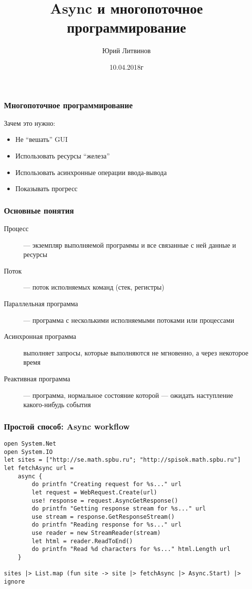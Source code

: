 \documentclass[xetex,mathserif,serif]{beamer}
\title{Async и многопоточное программирование}
\author{Юрий Литвинов}
\date{10.04.2018г}
\begin{document}
	
	\frame{\titlepage}

	\begin{frame}
		\frametitle{Многопоточное программирование}
		Зачем это нужно:
		\begin{itemize}
			\item Не ``вешать'' GUI
			\item Использовать ресурсы ``железа''
			\item Использовать асинхронные операции ввода-вывода
			\item Показывать прогресс
		\end{itemize}
	\end{frame}

	\begin{frame}
		\frametitle{Основные понятия}
		\begin{description}
			\item[Процесс] --- экземпляр выполняемой программы и все связанные с ней данные и ресурсы
			\item[Поток] --- поток исполняемых команд (стек, регистры)
			\item[Параллельная программа] --- программа с несколькими исполняемыми потоками или процессами
			\item[Асинхронная программа] выполняет запросы, которые выполняются не мгновенно, а через некоторое время
			\item[Реактивная программа] --- программа, нормальное состояние которой --- ожидать наступление какого-нибудь события
		\end{description}
	\end{frame}

	\begin{frame}[fragile]
		\frametitle{Простой способ: Async workflow}
		\begin{footnotesize}
			\begin{verbatim}
open System.Net
open System.IO
let sites = ["http://se.math.spbu.ru"; "http://spisok.math.spbu.ru"]
let fetchAsync url =
    async { 
        do printfn "Creating request for %s..." url
        let request = WebRequest.Create(url)
        use! response = request.AsyncGetResponse()
        do printfn "Getting response stream for %s..." url
        use stream = response.GetResponseStream()
        do printfn "Reading response for %s..." url
        use reader = new StreamReader(stream)
        let html = reader.ReadToEnd()
        do printfn "Read %d characters for %s..." html.Length url 
    }

sites |> List.map (fun site -> site |> fetchAsync |> Async.Start) |> ignore
			\end{verbatim}
		\end{footnotesize}
	\end{frame}
\end{document}

